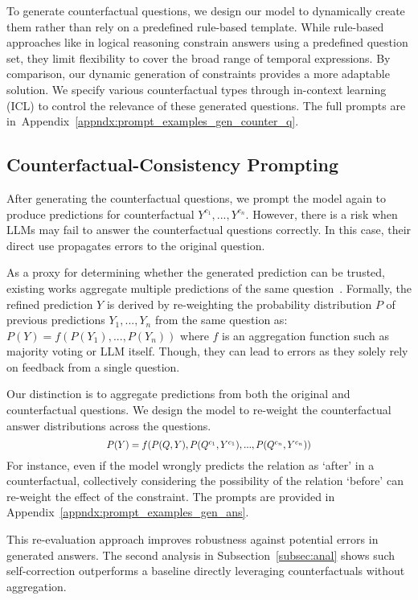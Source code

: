 To generate counterfactual questions, we design our model to dynamically create them rather than rely on a predefined rule-based template. While rule-based approaches like \citet{chen2024improving} in logical reasoning constrain answers using a predefined question set, they limit flexibility to cover the broad range of temporal expressions. By comparison, our dynamic generation of constraints provides a more adaptable solution.
We specify various counterfactual types through in-context learning (ICL) to control the relevance of these generated questions. The full prompts are in~Appendix~\ref{appndx:prompt_examples_gen_counter_q}.



\subsection{Counterfactual-Consistency Prompting}



After generating the counterfactual questions, we prompt the model again to produce predictions for counterfactual $Y^{c_1},...,Y^{c_{n}}$.
However, there is a risk when LLMs may fail to answer the counterfactual questions correctly.
In this case, their direct use propagates errors to the original question. 

As a proxy for determining whether the generated prediction can be trusted, existing works aggregate multiple predictions of the same question~\cite{wang2023self,du2024improving}.
Formally, the refined prediction $Y$ is derived by re-weighting the probability distribution $P$ of previous predictions $Y_{1},...,Y_{n}$ from the same question as:
$P(Y) = f(P(Y_{1}), ..., P(Y_{n}))$
where $f$ is an aggregation function such as majority voting or LLM itself. Though, they can lead to errors as they solely rely on feedback from a single question.

Our distinction is to aggregate predictions from both the original and counterfactual questions. We design the model to re-weight the counterfactual answer distributions across the questions. 
\begin{equation}
\scalebox{0.85}{$P(Y) = f(P(Q,Y), P(Q^{c_1}, Y^{c_1}), ..., P(Q^{c_n}, Y^{c_n}))$}
\end{equation}
For instance, even if the model wrongly predicts the relation as `after' in a counterfactual, collectively considering the possibility of the relation `before' can re-weight the effect of the constraint. The prompts are provided in Appendix~\ref{appndx:prompt_examples_gen_ans}.

This re-evaluation approach improves robustness against potential errors in generated answers.
The second analysis in Subsection~\ref{subsec:anal} shows such self-correction outperforms a baseline directly leveraging counterfactuals without aggregation.




